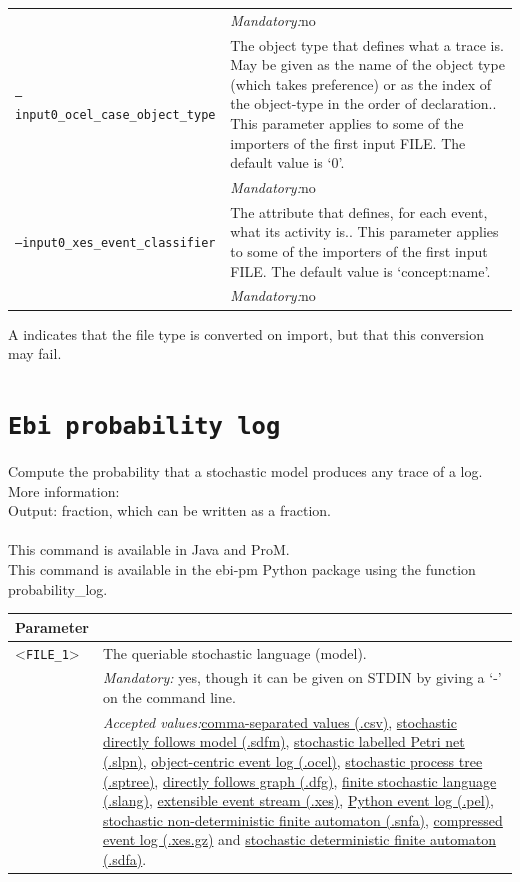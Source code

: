 {\begin{tabularx}{\linewidth}{lX}
&\textit{Mandatory:}\quad no\\
\texttt{--input0\_ocel\_case\_object\_type} & The object type that defines what a trace is. May be given as the name of the object type (which takes preference) or as the index of the object-type in the order of declaration.. This parameter applies to some of the importers of the first input FILE. The default value is `0'.\\
&\textit{Mandatory:}\quad no\\
\texttt{--input0\_xes\_event\_classifier} & The attribute that defines, for each event, what its activity is.. This parameter applies to some of the importers of the first input FILE. The default value is `concept:name'.\\
&\textit{Mandatory:}\quad no\\
\bottomrule
\end{tabularx}
A \textdagger{} indicates that the file type is converted on import, but that this conversion may fail.
\clearpage\section{\texttt{Ebi probability log}}
\label{command:Ebi probability log}
Compute the probability that a stochastic model produces any trace of a log.\\
More information: ~\cite{DBLP:journals/is/LeemansMM24}~\\
\noindent Output: fraction, which can be written as a fraction.\\
\\This command is available in Java and ProM.
\\This command is available in the ebi-pm Python package using the function probability\_log.
\begin{tabularx}{\linewidth}{lX}
\toprule
Parameter \\\midrule
<\texttt{FILE\_1}>&The queriable stochastic language (model).\\
&\textit{Mandatory:} \quad yes, though it can be given on STDIN by giving a `-' on the command line.\\
&\textit{Accepted values:}\quad \hyperref[filehandler:comma-separated values]{comma-separated values (.csv)}, \hyperref[filehandler:stochastic directly follows model]{stochastic directly follows model (.sdfm)}, \hyperref[filehandler:stochastic labelled Petri net]{stochastic labelled Petri net (.slpn)}, \hyperref[filehandler:object-centric event log]{object-centric event log (.ocel)}, \hyperref[filehandler:stochastic process tree]{stochastic process tree (.sptree)}, \hyperref[filehandler:directly follows graph]{directly follows graph (.dfg)}, \hyperref[filehandler:finite stochastic language]{finite stochastic language (.slang)}, \hyperref[filehandler:extensible event stream]{extensible event stream (.xes)}, \hyperref[filehandler:Python event log]{Python event log (.pel)}, \hyperref[filehandler:stochastic non-deterministic finite automaton]{stochastic non-deterministic finite automaton (.snfa)}, \hyperref[filehandler:compressed event log]{compressed event log (.xes.gz)} and \hyperref[filehandler:stochastic deterministic finite automaton]{stochastic deterministic finite automaton (.sdfa)}.\\

\end{tabularx}}
